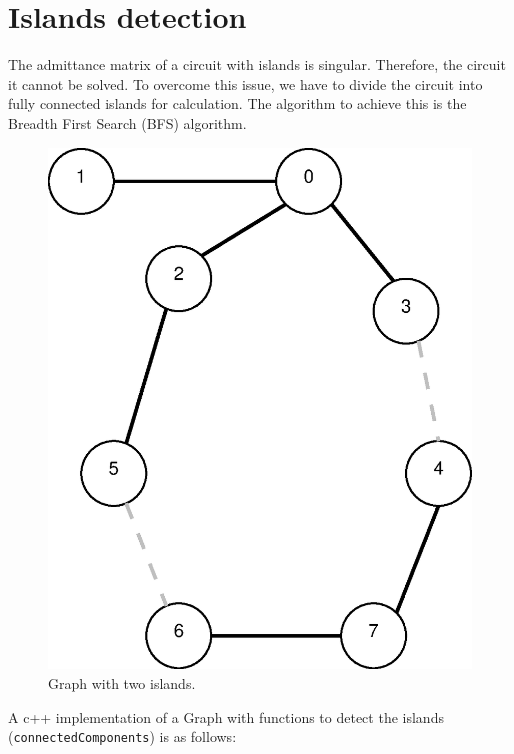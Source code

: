\documentclass[nols,a4paper,twoside,notoc,fleqn]{tufte-book}
\begin{document}





\section{Islands detection}

The admittance matrix of a circuit with islands is singular. Therefore, the circuit it cannot be solved. To overcome this issue, we have to divide the circuit into fully connected islands for calculation. The algorithm to achieve this is the Breadth First Search (BFS) algorithm.

\begin{figure}[h!]
	\centering
	\includegraphics[width=0.35\linewidth]{img/general_graph.eps}
	\caption{Graph with two islands.}
	\label{fig:general_graph}
\end{figure}

A c++ implementation of a Graph with functions to detect the islands (\verb|connectedComponents|) is as follows:
\end{document}
